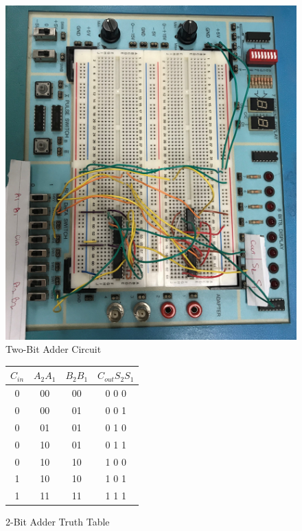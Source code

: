 \documentclass[11pt]{article}
\begin{document}
\begin{figure}
	\includegraphics[width=1.0\textwidth]{"TWO-BITADDER"}
	\caption{Two-Bit Adder Circuit}
\end{figure}

\begin{figure}[ht]\centering
	\begin{tabular}{c|c|c||c}
		\toprule
		$C_{in}$ & $A_{2}$$A_{1}$ & $B_{2}$$B_{1}$ &$C_{out}$$S_{2}$$S_{1}$  \\
		\midrule
		0 & 00 & 00 & 0 0 0\\
		0 & 00 & 01 & 0 0 1\\
		0 & 01 & 01 & 0 1 0\\
		0 & 10 & 01 & 0 1 1\\
		0 & 10 & 10 & 1 0 0\\
		1 & 10 & 10 & 1 0 1\\
		1 & 11 & 11 & 1 1 1\\
		\bottomrule
	\end{tabular} 
	
	\caption{2-Bit Adder Truth Table}
	
\end{figure}
\end{document}
